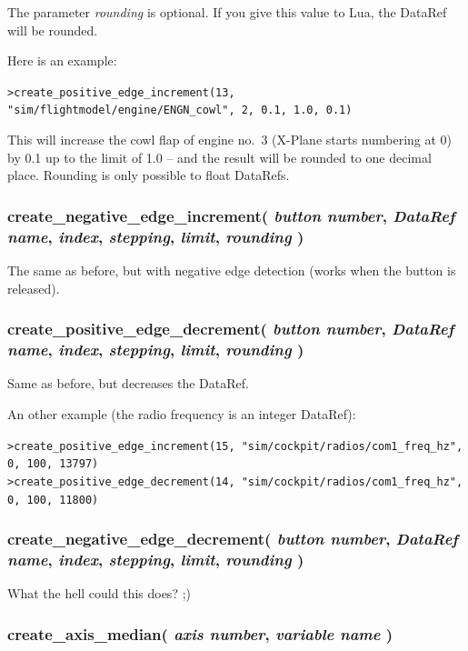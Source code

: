 \documentclass[11pt,parskip=half,a4paper]{scrartcl}
\begin{document}
The parameter \emph{rounding} is optional. If you give this value to Lua, the DataRef will be rounded.

Here is an example:

\verb|>create_positive_edge_increment(13, "sim/flightmodel/engine/ENGN_cowl", 2, 0.1, 1.0, 0.1)|

This will increase the cowl flap of engine no.~3 (X-Plane starts numbering at 0) by 0.1 up to the limit of 1.0 -- and the result will be rounded to one decimal place. Rounding is only possible to float DataRefs.

\subsubsection{create\_negative\_edge\_increment( \emph{button number}, \emph{DataRef name}, \emph{index}, \emph{stepping}, \emph{limit}, \emph{rounding} )}

The same as before, but with negative edge detection (works when the button is released).

\subsubsection{create\_positive\_edge\_decrement( \emph{button number}, \emph{DataRef name}, \emph{index}, \emph{stepping}, \emph{limit}, \emph{rounding} )}

Same as before, but decreases the DataRef.

An other example (the radio frequency is an integer DataRef):

\verb|>create_positive_edge_increment(15, "sim/cockpit/radios/com1_freq_hz", 0, 100, 13797)|\\
\verb|>create_positive_edge_decrement(14, "sim/cockpit/radios/com1_freq_hz", 0, 100, 11800)|

\subsubsection{create\_negative\_edge\_decrement( \emph{button number}, \emph{DataRef name}, \emph{index}, \emph{stepping}, \emph{limit}, \emph{rounding} )}

What the hell could this does? ;)

\subsubsection{create\_axis\_median( \emph{axis number}, \emph{variable name} )}
\end{document}
